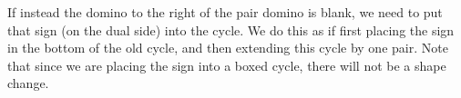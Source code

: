 \documentclass[12pt]{article}
\numberwithin{equation}{section}
\newcommand{\horizontalDominoRSShift}[4]{\filldraw [dominoRSStyle] (#2 - 1 + #4 + \eps, #1 - 1 + \eps) rectangle + (2 - \teps, 1 -\teps) node [dominoText] {$#3$};}
\newcommand{\verticalDominoRSShift}[4]{\filldraw [dominoRSStyle] (#2 - 1 + #4 + \eps,  #1 - 1 + \eps) rectangle + (1 - \teps,2 -\teps) node [dominoText] {$#3$};}
\begin{document}
\begin{itemize}
\begin{itemize}
      If instead the domino to the right of the pair domino is blank, we need to put that sign (on the dual side) into the cycle.
      We do this as if first placing the sign in the bottom of the old cycle, and then extending this cycle by one pair.
      Note that since we are placing the sign into a boxed cycle, there will not be a shape change.
      \begin{figure}[H]
        \centering
      \end{figure}

\end{itemize}
\end{itemize}
\end{document}
